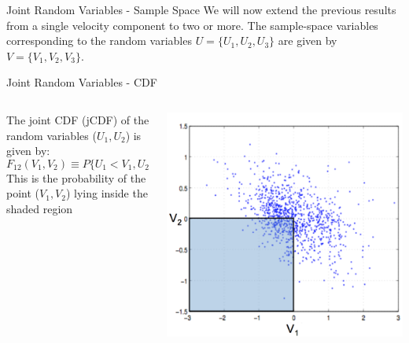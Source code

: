 
\begin{frame}{Joint Random Variables - Sample Space}
  We will now extend the previous results from a single velocity component to two or more.\newline\newline
  The sample-space variables corresponding to the random variables $U=\{U_1,U_2,U_3\}$ are given by $V=\{V_1,V_2,V_3\}$.
\end{frame}


\begin{frame}{Joint Random Variables - CDF}
  
  \setlength{\fboxsep}{0pt}
\setlength{\fboxrule}{1pt}
\begin{columns}[T]
    \begin{column}{.55\textwidth}
    \begin{minipage}[c][.6\textheight][c]{\linewidth}
    The joint CDF (jCDF) of the random variables ($U_1, U_2$) is given by:
  $$F_{12}(V_1,V_2) \equiv P\{U_1 < V_1, U_2 < V_2\}$$
  This is the probability of the point ($V_1,V_2$) lying inside the shaded region 
      \end{minipage}
    \end{column}
    \begin{column}{.55\textwidth}
      \includegraphics[width=\textwidth]{jr2.png}
    \end{column}
  \end{columns}
  
\end{frame}

